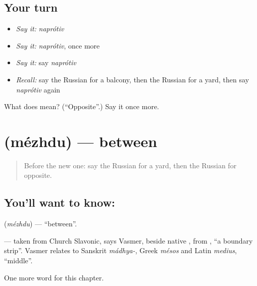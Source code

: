 \subsection*{Your turn}
\begin{itemize}
\raggedright
  \item \emph{Say it:} \emph{naprótiv}
  \item \emph{Say it:} \emph{naprótiv}, once more
  \item \emph{Say it:} say \emph{naprótiv}
  \item \emph{Recall:} say the Russian for a balcony, then the Russian for a yard, then say \emph{naprótiv} again
\end{itemize}

\begin{tcolorbox}[breakable,colback=teal!4,colframe=teal!35!black,title={Before you move on}]
What does  mean? (\textquotedblleft{}Opposite\textquotedblright{}.) Say it once more.
\end{tcolorbox}
\section[\texorpdfstring{\ru{между} (mézhdu)}{между (mézhdu)}]{ (mézhdu) — between}

\label{lesson:RU-C241-mezhdu}



\begin{quote}
Before the new one: say the Russian for a yard, then the Russian for opposite.
\end{quote}

\subsection*{You'll want to know: }
\textbf{} (\emph{mézhdu}) — \textquotedblleft{}between\textquotedblright{}.

\begin{cousinweb}
\textbf{} — taken from Church Slavonic, says Vasmer, beside native \emph{}, from \emph{}, \textquotedblleft{}a boundary strip\textquotedblright{}. Vasmer relates \emph{} to Sanskrit \emph{mádhya-}, Greek \emph{mésos} and Latin \emph{medius}, \textquotedblleft{}middle\textquotedblright{}.
\end{cousinweb}

\begin{grammarlens}[title={What you've built}]
One more word for this chapter.
\end{grammarlens}

